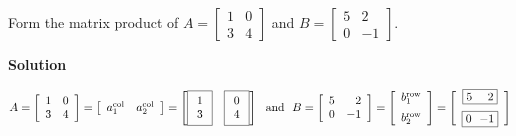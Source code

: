 \begin{example}
\label{ex:LUprod}
Form the matrix product of $A=\left[\begin{array}{cc} 1 & 0\\
3 & 4\end{array}\right]$ and $B=\left[\begin{array}{rr}
 5 &2  \\
0 & -1 \end{array}\right].$
\end{example}

\textbf{Solution}

$$A=\left[\begin{array}{cc} 1 & 0\\
3 & 4\end{array}\right] = \left[\begin{array}{cc} a_1^{\rm col} & a_2^{\rm col} \end{array}\right]  = 
\left[ \boxed{\begin{array}{c} 1 \\ 3 \end{array} }~~~
\boxed{\begin{array}{c} 0 \\ 4 \end{array} }\right]
~~\text{and}~~B=\left[\begin{array}{rr}
 5 &2  \\
0 & -1 \end{array}\right] = \left[\begin{array}{c} b_1^{\rm row} \medskip \\
b_2^{\rm row} \end{array}\right]  = \left[\begin{array}{c}\boxed{ 5 ~~~~ 2} \medskip \\
\boxed{ 0 ~~{-1}}
\end{array} \right]$$

